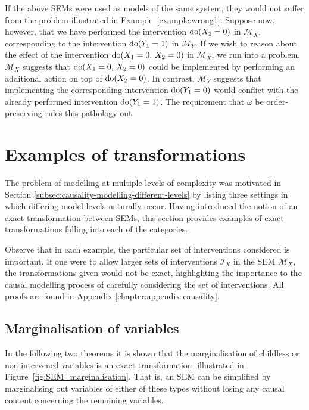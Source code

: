 If the above SEMs were used as models of the same system, they would not suffer from the problem illustrated in Example~\ref{example:wrong1}.
Suppose now, however, that we have performed the intervention $\operatorname{do}(X_2=0)$ in $\mathcal{M}_X$, corresponding to the intervention $\operatorname{do}(Y_1=1)$ in $\mathcal{M}_Y$.
If we wish to reason about the effect of the intervention $\operatorname{do}(X_1=0,\, X_2=0)$ in $\mathcal{M}_X$, we run into a problem.
$\mathcal{M}_X$ suggests that $\operatorname{do}(X_1=0,\, X_2=0)$ could be implemented by performing an additional action on top of $\operatorname{do}(X_2=0)$.
In contrast, $\mathcal{M}_Y$ suggests that implementing the corresponding intervention $\operatorname{do}(Y_1=0)$ would conflict with the already performed intervention $\operatorname{do}(Y_1=1)$.
The requirement that $\omega$ be order-preserving rules this pathology out. 

\section{Examples of transformations}\label{sec:causality-causal-examples-of-transformations}

The problem of modelling at multiple levels of complexity was motivated in Section \ref{subsec:causality-modelling-different-levels} by listing three settings in which differing model levels naturally occur.
Having introduced the notion of an exact transformation between SEMs, this section provides examples of exact transformations falling into each of the categories.

Observe that in each example, the particular set of interventions considered is important. If one were to allow larger sets of interventions $\mathcal{I}_X$ in the SEM $\mathcal{M}_X$, the transformations given would not be exact, highlighting the importance to the causal modelling process of carefully considering the set of interventions. All proofs are found in Appendix \ref{chapter:appendix-causality}.






\subsection{Marginalisation of variables}\label{sec:basic_trafos}

In the following two theorems it is shown that the marginalisation of childless or non-intervened variables is an exact transformation, illustrated in Figure~\ref{fig:SEM_marginalisation}.
That is, an SEM can be simplified by marginalising out variables of either of these types without losing any causal content concerning the remaining variables.

